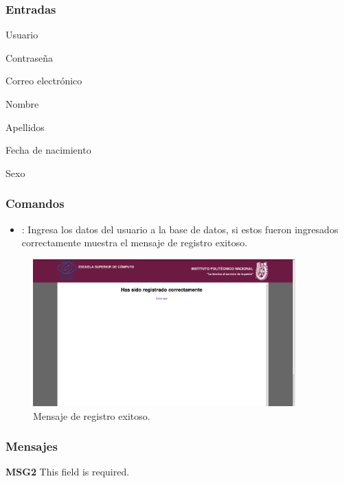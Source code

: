 \subsubsection{Entradas}
\begin{Citemize}

\item Usuario 
\item Contrase\~na
\item Correo electr\'onico 
\item Nombre
\item Apellidos
\item Fecha de nacimiento
\item Sexo
\end{Citemize}

\subsubsection{Comandos}
\begin{itemize}
	\item {}: Ingresa los datos del usuario a la base de datos, si estos fueron ingresados correctamente muestra el mensaje de registro exitoso. \end{itemize}
	\begin{figure}[htbp!]
		\centering
			\includegraphics[width=0.9\textwidth]{images/Modulo1/SalidaRegistro}
		\caption{Mensaje de registro exitoso.}
	\end{figure}
\subsubsection{Mensajes}
	\begin{Citemize}
		\item {\bf MSG2} This field is required.	\end{Citemize}
		
			\pagebreak%
